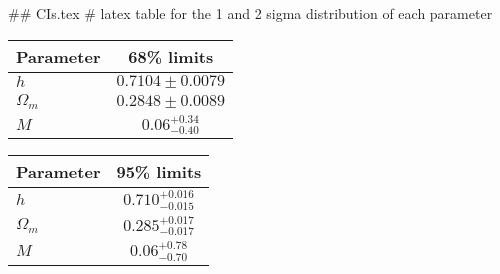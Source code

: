 ## CIs.tex
# latex table for the 1 and 2 sigma distribution of each parameter

\begin{tabular} { l  c}
 Parameter &  68\% limits\\
\hline
{\boldmath$h              $} & $0.7104\pm 0.0079          $\\
{\boldmath$\Omega_m       $} & $0.2848\pm 0.0089          $\\
{\boldmath$M              $} & $0.06^{+0.34}_{-0.40}      $\\
\hline
\end{tabular}

\begin{tabular} { l  c}
 Parameter &  95\% limits\\
\hline
{\boldmath$h              $} & $0.710^{+0.016}_{-0.015}   $\\
{\boldmath$\Omega_m       $} & $0.285^{+0.017}_{-0.017}   $\\
{\boldmath$M              $} & $0.06^{+0.78}_{-0.70}      $\\
\hline
\end{tabular}
